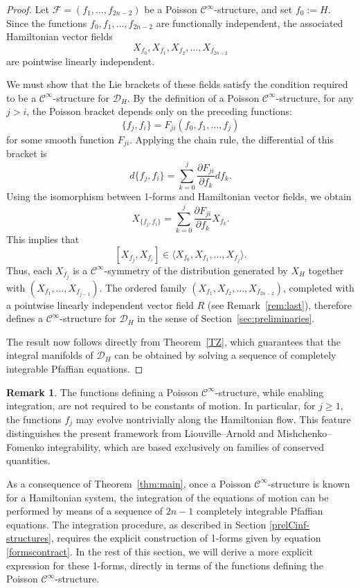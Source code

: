 \documentclass{article}
\theoremstyle{remark}
\theoremstyle{definition}
\newtheorem{remark}{Remark}[section]
\newcommand{\cinf}{$\mathcal{C}^{\infty}$}
\begin{document}
\begin{proof}
\sloppy
Let $\mathcal{F}=(f_1,\dots,f_{2n-2})$ be a Poisson \cinf-structure, and set $f_0:=H$.
Since the functions $f_0,f_1,\dots,f_{2n-2}$ are functionally independent, the associated Hamiltonian
vector fields 
$$
X_{f_0}, X_{f_1},X_{f_2},\dots,X_{f_{2n-2}}
$$
are pointwise linearly independent.

We must show that the Lie brackets of these fields satisfy the condition required to be a \cinf-structure for $\mathcal{D}_H$. By the definition of a Poisson \cinf-structure, for any $j > i$, the Poisson bracket depends only on the preceding functions:
\[
\{f_j, f_i\} = F_{ji}(f_0, f_1, \dots, f_j)
\]
for some smooth function $F_{ji}$. Applying the chain rule, the differential of this bracket is
\[
d\{f_j, f_i\} = \sum_{k=0}^j \frac{\partial F_{ji}}{\partial f_k} df_k.
\]
Using the isomorphism between 1-forms and Hamiltonian vector fields, we obtain
\[
X_{\{f_j,f_i\}} = \sum_{k=0}^j \frac{\partial F_{ji}}{\partial f_k} X_{f_k}.
\]
This implies that
\[
[X_{f_j},X_{f_i}] \in \langle X_{f_0}, X_{f_1}, \dots, X_{f_j} \rangle.
\]
Thus, each $X_{f_j}$ is a \cinf-symmetry of the distribution generated by $X_H$ together with $(X_{f_1},\dots,X_{f_{j-1}})$. The ordered family $(X_{f_1},X_{f_2},\dots,X_{f_{2n-2}})$, completed with a pointwise linearly independent vector field $R$ (see Remark~\ref{rem:last}), therefore defines a \cinf-structure for $\mathcal{D}_H$ in the sense of Section~\ref{sec:preliminaries}.

The result now follows directly from Theorem~\ref{TZ}, which
guarantees that the integral manifolds of $\mathcal{D}_H$ can be obtained by
solving a sequence of completely integrable Pfaffian equations.
\end{proof}





\begin{remark}
The functions defining a Poisson \cinf-structure, while enabling integration, are not required to be
constants of motion. In particular, for $j\geq 1$, the functions $f_j$ may evolve
nontrivially along the Hamiltonian flow. This feature distinguishes the present
framework from Liouville--Arnold and Mishchenko--Fomenko integrability, which are
based exclusively on families of conserved quantities.
\end{remark}



As a consequence of Theorem~\ref{thm:main}, once a Poisson \cinf-structure is known for a Hamiltonian system, the integration of the equations of motion can be performed by means of a sequence of $2n-1$ completely integrable Pfaffian equations. The integration procedure, as described in Section \ref{prelCinf-structures}, requires the explicit construction of 1-forms given by equation \eqref{formscontract}. In the rest of this section, we will derive a more explicit expression for these 1-forms, directly in terms of the functions defining the Poisson \cinf-structure. 
\end{document}
